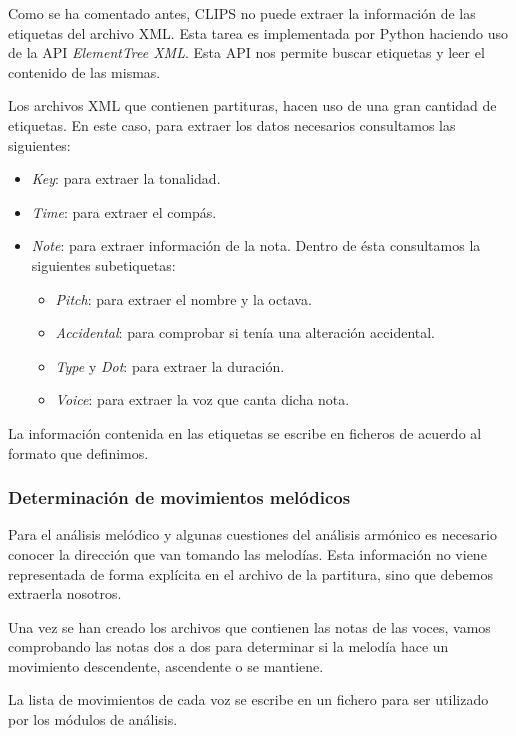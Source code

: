 Como se ha comentado antes, CLIPS no puede extraer la información de las etiquetas del archivo XML. Esta tarea es implementada por Python haciendo uso de la API \textit{ElementTree XML}. Esta API nos permite buscar etiquetas y leer el contenido de las mismas. 

Los archivos XML que contienen partituras, hacen uso de una gran cantidad de etiquetas. En este caso, para extraer los datos necesarios consultamos las siguientes:

\begin{itemize}

	\item \textit{Key}: para extraer la tonalidad.
	\item \textit{Time}: para extraer el compás.
	\item \textit{Note}: para extraer información de la nota. Dentro de ésta consultamos la siguientes subetiquetas:
		\begin{itemize}
			\item \textit{Pitch}: para extraer el nombre y la octava. 
			\item \textit{Accidental}: para comprobar si tenía una alteración accidental.
			\item \textit{Type} y \textit{Dot}: para extraer la duración.
			\item \textit{Voice}: para extraer la voz que canta dicha nota.
		\end{itemize}
\end{itemize}

La información contenida en las etiquetas se escribe en ficheros de acuerdo al formato que definimos.

\subsubsection{Determinación de movimientos melódicos}

Para el análisis melódico y algunas cuestiones del análisis armónico es necesario conocer la dirección que van tomando las melodías. Esta información no viene representada de forma explícita en el archivo de la partitura, sino que debemos extraerla nosotros. 

Una vez se han creado los archivos que contienen las notas de las voces, vamos comprobando las notas dos a dos para determinar si la melodía hace un movimiento descendente, ascendente o se mantiene. 

La lista de movimientos de cada voz se escribe en un fichero para ser utilizado por los módulos de análisis.

